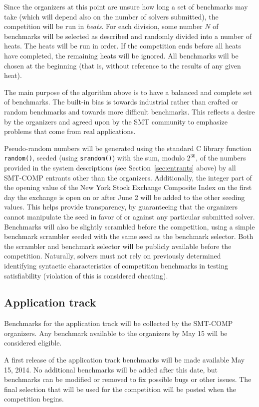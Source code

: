 \documentclass[12pt]{article}
\begin{document}
Since the organizers at this point are unsure how long a set of benchmarks may take (which will depend also on the number of solvers submitted), the competition will be run in {\em heats}. For each division, some number $N$ of benchmarks will be selected as described and randomly divided into a number of heats. The heats will be run in order. If the competition ends before all heats have completed, the remaining heats will be ignored. All benchmarks will be chosen at the beginning (that is, without reference to the results of any given heat).

The main purpose of the algorithm above is to have a balanced and complete set
of benchmarks.  The  built-in bias is towards industrial rather than crafted
or random benchmarks and towards more difficult benchmarks.
  This reflects a desire by the organizers and agreed upon
by the SMT community to emphasize problems that come from real applications.

Pseudo-random numbers will be generated using the standard C library
function \texttt{random()}, seeded (using \texttt{srandom()}) with the
sum, modulo $2^{30}$, of the numbers provided in the system
descriptions (see Section~\ref{sec:entrants} above) by all SMT-COMP
entrants other than the organizers.  Additionally, the integer part of
the opening value of the New York Stock Exchange Composite Index on
the first day the exchange is open on or after June 2
will be added to the other seeding values.  This helps provide transparency,
by guaranteeing that the organizers cannot manipulate the seed in
favor of or against any particular submitted solver.  Benchmarks will also be slightly
scrambled before the competition, using a simple benchmark scrambler
seeded with the same seed as the benchmark selector.  Both the
scrambler and benchmark selector will be publicly available before the
competition.  Naturally, solvers must not rely on previously
determined identifying syntactic characteristics of competition
benchmarks in testing satisfiability (violation of this is considered
cheating).

\subsection{Application track}

Benchmarks for the application track will be collected by the SMT-COMP organizers.
Any benchmark available to the organizers by May 15 will be considered eligible.

A first release of the application track
benchmarks will be made available May 15, 2014.
No additional
benchmarks will be added after this date, but benchmarks can be
modified or removed to fix possible bugs or other issues. 
The final selection that will be used for the competition will be posted when the competition begins.
\end{document}
